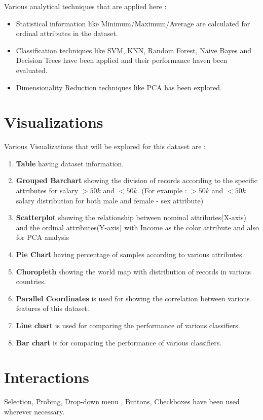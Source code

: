 \documentclass{article}
\begin{document}
\noindent Various analytical techniques that are applied here :
\begin{itemize}
\item Statistical information like Minimum/Maximum/Average are calculated for ordinal attributes in the dataset.
\item Classification techniques like SVM, KNN, Random Forest, Naive Bayes and Decision Trees have been applied and their performance haven been evaluated.
\item Dimensionality Reduction techniques like PCA has been explored.
\end{itemize}

\section*{Visualizations}  
Various Visualizations that will be explored for this dataset are :
\begin{enumerate}
\item {\textbf{Table}} having dataset information.
\item {\textbf{Grouped Barchart}} showing the division of records according to the specific attributes for salary $>50k$ and $<50k$. (For example :  $>50k$ and $<50k$ salary distribution for both male and female - sex attribute)
\item {\textbf{Scatterplot}} showing the relationship between nominal attributes(X-axis) and the ordinal attributes(Y-axis) with Income as the color attribute and also for PCA analysis
\item {\textbf{Pie Chart}} having percentage of samples according to various attributes.
\item {\textbf{Choropleth}} showing the world map with distribution of records in various countries.
\item {\textbf{Parallel Coordinates}} is used for showing the correlation between various features of this dataset.
\item {\textbf{Line chart}} is used for comparing the performance of various classifiers.
\item {\textbf{Bar chart}} is for comparing the performance of various classifiers.
\end{enumerate}

\section*{Interactions} 
 
Selection, Probing, Drop-down menu , Buttons, Checkboxes have been used wherever necessary.
\end{document}

